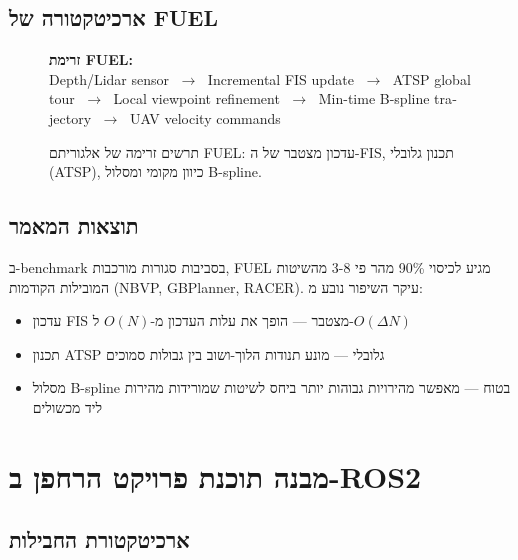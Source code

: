 \documentclass[11pt,a4paper]{article}
\begin{document}
\subsection{ארכיטקטורה של \textenglish{FUEL}}

\begin{figure}[h]
    \centering
    \begin{minipage}{0.85\textwidth}
        \textbf{זרימת \textenglish{FUEL}:}\\[4pt]
        \textenglish{%
        Depth/Lidar sensor $\;\longrightarrow\;$ Incremental FIS update
        $\;\longrightarrow\;$ ATSP global tour
        $\;\longrightarrow\;$ Local viewpoint refinement
        $\;\longrightarrow\;$ Min-time B-spline trajectory
        $\;\longrightarrow\;$ UAV velocity commands}
    \end{minipage}
    \caption{תרשים זרימה של אלגוריתם \textenglish{FUEL}: עדכון מצטבר של ה-\textenglish{FIS}, תכנון גלובלי (\textenglish{ATSP}), כיוון מקומי ומסלול \textenglish{B-spline}.}
    \label{fig:fuel_pipeline}
\end{figure}

\subsection{תוצאות המאמר}

ב-\textenglish{benchmark} בסביבות סגורות מורכבות, \textenglish{FUEL} מגיע לכיסוי 90\% מהר פי 3-8 מהשיטות המובילות הקודמות (\textenglish{NBVP, GBPlanner, RACER}). עיקר השיפור נובע מ:
\begin{itemize}
    \item עדכון \textenglish{FIS} מצטבר — הופך את עלות העדכון מ-$O(N)$ ל-$O(\Delta N)$
    \item תכנון \textenglish{ATSP} גלובלי — מונע תנודות הלוך-ושוב בין גבולות סמוכים
    \item מסלול \textenglish{B-spline} בטוח — מאפשר מהירויות גבוהות יותר ביחס לשיטות שמורידות מהירות ליד מכשולים
\end{itemize}

\section{מבנה תוכנת פרויקט הרחפן ב-\textenglish{ROS2}}

\subsection{ארכיטקטורת החבילות}
\end{document}
